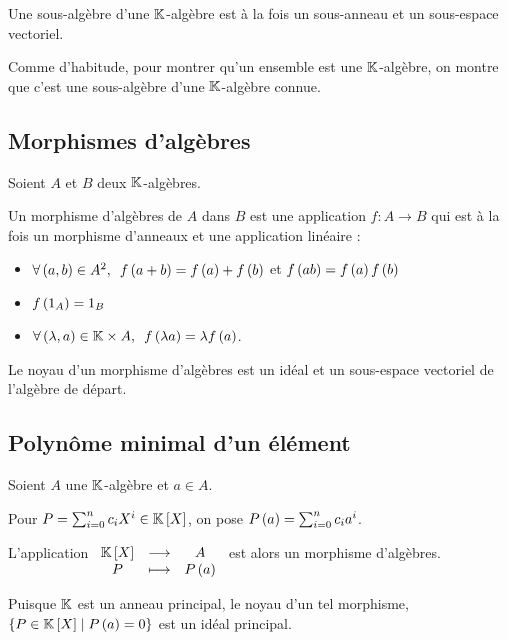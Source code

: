 \begin{defi}
Une sous-algèbre d'une \(\mathbb{K}\)-algèbre est à la fois un sous-anneau et un sous-espace vectoriel.
\end{defi}

Comme d'habitude, pour montrer qu'un ensemble est une \(\mathbb{K}\)-algèbre, on montre que c'est une sous-algèbre d'une \(\mathbb{K}\)-algèbre connue.

\subsection{Morphismes d'algèbres}

\begin{defi}
Soient \(A\) et \(B\) deux \(\mathbb{K}\)-algèbres.

Un morphisme d'algèbres de \(A\) dans \(B\) est une application \(f:A\to B\) qui est à la fois un morphisme d'anneaux et une application linéaire :

\begin{itemize}
    \item \(\quantifs{\forall\paren{a,b}\in A^2}f\paren{a+b}=f\paren{a}+f\paren{b}\) et \(f\left(ab\right)=f\left(a\right)f\left(b\right)\) \\
    \item \(f\left(1_A\right)=1_B\) \\
    \item \(\quantifs{\forall\paren{\lambda,a}\in\K\times A}f\paren{\lambda a}=\lambda f\paren{a}\).
\end{itemize}
\end{defi}

\begin{prop}
Le noyau d'un morphisme d'algèbres est un idéal et un sous-espace vectoriel de l'algèbre de départ.
\end{prop}

\subsection{Polynôme minimal d'un élément}

\begin{prop}
Soient \(A\) une \(\mathbb{K}\)-algèbre et \(a\in A\).

Pour \(P=\sum_{i=0}^nc_iX^i\in\poly\), on pose \(P\left(a\right)=\sum_{i=0}^nc_ia^i\).

L'application \(\fonctionlambda{\poly}{A}{P}{P\paren{a}}\) est alors un morphisme d'algèbres.
\end{prop}

Puisque \(\mathbb{K}\) est un anneau principal, le noyau d'un tel morphisme, \ie \(\accol{P\in\poly\tq P\paren{a}=0}\) est un idéal principal.

